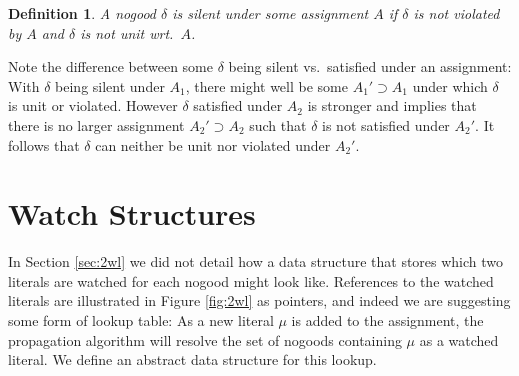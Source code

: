 \documentclass[final]{vutinfth} %
\newtheorem{definition}{Definition}[chapter]
\newcommand{\ass}{A}
\newcommand{\sgl}{\mu}
\begin{document}
\begin{definition}
A nogood $\delta$ is \emph{silent} under some assignment $\ass$ if $\delta$ is not violated by $\ass$ and $\delta$ is not unit wrt.~$\ass$.
\end{definition}

Note the difference between some $\delta$ being silent vs.~satisfied under an assignment: With $\delta$ being silent under $\ass_1$, there might well be some $\ass_1' \supset \ass_1$ under which $\delta$ is unit or violated. However $\delta$ satisfied under $\ass_2$ is stronger and implies that there is no larger assignment $\ass_2' \supset \ass_2$ such that $\delta$ is not satisfied under $\ass_2'$. It follows that $\delta$ can neither be unit nor violated under $\ass_2'$.

\section{Watch Structures}

In Section \ref{sec:2wl} we did not detail how a data structure that stores which two literals are watched for each nogood might look like. References to the watched literals are illustrated in Figure \ref{fig:2wl} as pointers, and indeed we are suggesting some form of lookup table: As a new literal $\sgl$ is added to the assignment, the propagation algorithm will resolve the set of nogoods containing $\sgl$ as a watched literal. We define an abstract data structure for this lookup.





\end{document}
